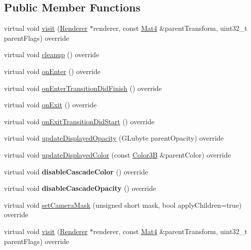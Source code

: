 \subsection*{Public Member Functions}
\begin{DoxyCompactItemize}
\item 
virtual void \hyperlink{classProtectedNode_afb1b2f3712d91a38bd5c691eeec6bbb9}{visit} (\hyperlink{classRenderer}{Renderer} $\ast$renderer, const \hyperlink{classMat4}{Mat4} \&parent\+Transform, uint32\+\_\+t parent\+Flags) override
\item 
virtual void \hyperlink{classProtectedNode_a5462a6202b458193c1881bcdcc5be78d}{cleanup} () override
\item 
virtual void \hyperlink{classProtectedNode_ade991090bee4173b4e1f47382adc99b9}{on\+Enter} () override
\item 
virtual void \hyperlink{classProtectedNode_ab424c044446f8c5cf2018e450c4df78c}{on\+Enter\+Transition\+Did\+Finish} () override
\item 
virtual void \hyperlink{classProtectedNode_ad3eed150eb7243f2de8b2e527752a3a6}{on\+Exit} () override
\item 
virtual void \hyperlink{classProtectedNode_a3f4bf0c9b9ec81b486f479d30fc1ed67}{on\+Exit\+Transition\+Did\+Start} () override
\item 
virtual void \hyperlink{classProtectedNode_abe8e7d89709e01b0500ae8cf63991806}{update\+Displayed\+Opacity} (G\+Lubyte parent\+Opacity) override
\item 
virtual void \hyperlink{classProtectedNode_a53b09aefb1db2c87f6ee6560b0c48430}{update\+Displayed\+Color} (const \hyperlink{structColor3B}{Color3B} \&parent\+Color) override
\item 
\mbox{\label{classProtectedNode_ae99076f31c4d18fa75f0a50a79f49a45}} 
virtual void {\bfseries disable\+Cascade\+Color} () override
\item 
\mbox{\label{classProtectedNode_abc92a02814bd39651c5d295626ddb896}} 
virtual void {\bfseries disable\+Cascade\+Opacity} () override
\item 
virtual void \hyperlink{classProtectedNode_a45ddaa88c746ea6707b8a09bb50b457d}{set\+Camera\+Mask} (unsigned short mask, bool apply\+Children=true) override
\item 
virtual void \hyperlink{classProtectedNode_a705c838f46afa1b9eac5dae2aa4bc310}{visit} (\hyperlink{classRenderer}{Renderer} $\ast$renderer, const \hyperlink{classMat4}{Mat4} \&parent\+Transform, uint32\+\_\+t parent\+Flags) override

\end{DoxyCompactItemize}
